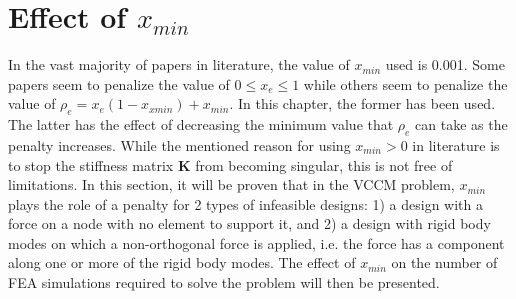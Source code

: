 \section{Effect of $x_{min}$} \label{sec:xmin_sens}

  In the vast majority of papers in literature, the value of $x_{min}$ used is 0.001. Some papers seem to penalize the value of $0 \leq x_e \leq 1$ while others seem to penalize the value of $\rho_e = x_e (1 - x_{xmin}) + x_{min}$. In this chapter, the former has been used. The latter has the effect of decreasing the minimum value that $\rho_e$ can take as the penalty increases. While the mentioned reason for using $x_{min} > 0$ in literature is to stop the stiffness matrix $\bm{K}$ from becoming singular, this is not free of limitations. In this section, it will be proven that in the VCCM problem, $x_{min}$ plays the role of a penalty for 2 types of infeasible designs: 1) a design with a force on a node with no element to support it, and 2) a design with rigid body modes on which a non-orthogonal force is applied, i.e. the force has a component along one or more of the rigid body modes. The effect of $x_{min}$ on the number of FEA simulations required to solve the problem will then be presented.

